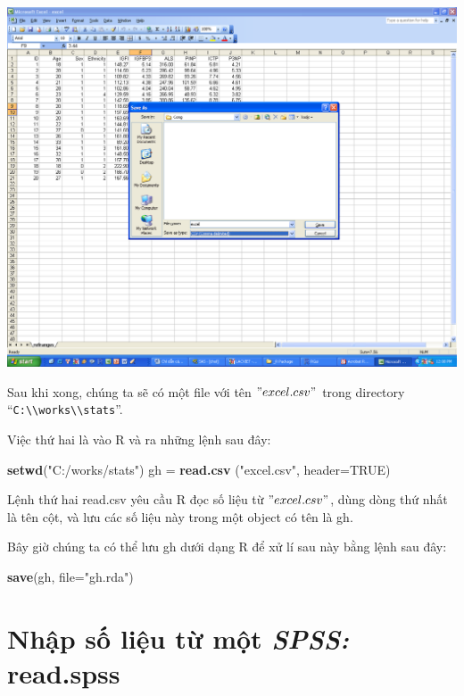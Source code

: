 \documentclass[
]{book}
\newenvironment{Shaded}{\begin{snugshade}}{\end{snugshade}}
\newcommand{\DataTypeTok}[1]{\textcolor[rgb]{0.13,0.29,0.53}{#1}}
\newcommand{\KeywordTok}[1]{\textcolor[rgb]{0.13,0.29,0.53}{\textbf{#1}}}
\newcommand{\NormalTok}[1]{#1}
\newcommand{\OtherTok}[1]{\textcolor[rgb]{0.56,0.35,0.01}{#1}}
\newcommand{\StringTok}[1]{\textcolor[rgb]{0.31,0.60,0.02}{#1}}
\begin{document}
\includegraphics{_book_media/Figures/2.2.png}

Sau khi xong, chúng ta sẽ có một file với tên \("excel.csv"\) trong directory ``\texttt{C:\textbackslash{}\textbackslash{}works\textbackslash{}\textbackslash{}stats}''.

Việc thứ hai là vào R và ra những lệnh sau đây:

\begin{Shaded}
\begin{Highlighting}[]
\KeywordTok{setwd}\NormalTok{(}\StringTok{"C:/works/stats"}\NormalTok{)}
\NormalTok{gh =}\StringTok{ }\KeywordTok{read.csv}\NormalTok{ (}\StringTok{"excel.csv"}\NormalTok{, }\DataTypeTok{header=}\OtherTok{TRUE}\NormalTok{)}
\end{Highlighting}
\end{Shaded}

Lệnh thứ hai read.csv yêu cầu R đọc số liệu từ \("excel.csv"\), dùng dòng thứ nhất là tên cột, và lưu các số liệu này trong một object có tên là gh.

Bây giờ chúng ta có thể lưu gh dưới dạng R để xử lí sau này bằng lệnh sau đây:

\begin{Shaded}
\begin{Highlighting}[]
\KeywordTok{save}\NormalTok{(gh, }\DataTypeTok{file=}\StringTok{"gh.rda"}\NormalTok{)}
\end{Highlighting}
\end{Shaded}

\hypertarget{nhux1eadp-sux1ed1-liux1ec7u-tux1eeb-mux1ed9t-spss-read.spss}{%
\section{\texorpdfstring{Nhập số liệu từ một \emph{SPSS:} read.spss}{Nhập số liệu từ một SPSS: read.spss}}\label{nhux1eadp-sux1ed1-liux1ec7u-tux1eeb-mux1ed9t-spss-read.spss}}
\end{document}
